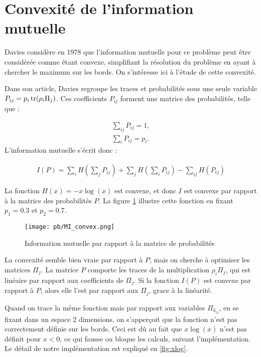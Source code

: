 \section{Convexité de l'information mutuelle}
Davies considère en 1978 que l'information mutuelle pour ce problème peut être considérée comme étant convexe, simplifiant la résolution du problème en ayant à chercher le maximum sur les bords. On s'intéresse ici à l'étude de cette convexité.

Dans son article, Davies regroupe les traces et probabilités sous une seule variable $P_{ij} = p_i \operatorname{tr}(\rho_i \Pi_j)$. Ces coefficients $P_{ij}$ forment une matrice des probabilités, telle que :

\begin{align}
    \displaystyle \sum_{ij} P_{ij} = 1, \\
    \displaystyle \sum_{i}  P_{ij} = p_i.
\end{align}
L'information mutuelle s'écrit donc :

\begin{align}
    I(P) = \displaystyle \sum_{i} H(\displaystyle \sum_{j}P_{ij}) + \displaystyle \sum_{j} H(\displaystyle \sum_{i}P_{ij}) -  \displaystyle \sum_{ij} H(P_{ij}) 
\end{align}

La fonction $H(x) = -x \log(x)$ est convexe, et donc $I$ est convexe par rapport à la matrice des probabilités $P$. La figure \ref{fig:mi_convex} illustre cette fonction en fixant $p_1 = 0.3$ et $p_2 = 0.7$.

\begin{figure}[h]
    \centering
    \texttt{[image: pb/MI\_convex.png]}
    \caption{Information mutuelle par rapport à la matrice de probabilités}
    \label{fig:mi_convex}
\end{figure}

La convexité semble bien vraie par rapport à $P$, mais on cherche à optimiser les matrices $\Pi_j$. La matrice $P$ comporte les traces de la multiplication $\rho_i \Pi_j$, qui est linéaire par rapport aux coefficients de $\Pi_j$. Si la fonction $I(P)$ est convexe par rapport à $P$, alors elle l'est par rapport aux $\Pi_j$, grace à la linéarité.

Quand on trace la même fonction mais par rapport aux variables $\Pi_{k_{ij}}$, en se fixant dans un espace 2 dimensions, on s'apperçoit que la fonction n'est pas correctement définie sur les bords. Ceci est dû au fait que $x\log(x)$ n'est pas définit pour $x < 0$, ce qui fausse ou bloque les calculs, suivant l'implémentation. Le détail de notre implémentation est expliqué en \ref{fig:xlog}. %

